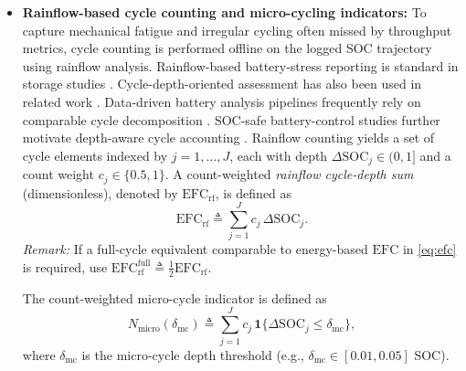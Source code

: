 \documentclass[preprint,12pt]{elsarticle}
\newcommand{\SOC}{\mathrm{SOC}}
\newcommand{\EFC}{\mathrm{EFC}}
\newcommand{\EFCrf}{\mathrm{EFC}_{\mathrm{rf}}}
\newcommand{\Nmicro}{N_{\mathrm{micro}}}
\newcommand{\dmc}{\delta_{\mathrm{mc}}}
\begin{document}
\begin{itemize}
\item \textbf{Rainflow-based cycle counting and micro-cycling indicators:}
To capture mechanical fatigue and irregular cycling often missed by throughput metrics, cycle counting is performed offline on the logged SOC trajectory using rainflow analysis. Rainflow-based battery-stress reporting is standard in storage studies \cite{gundogdu2018}. Cycle-depth-oriented assessment has also been used in related work \cite{soto2022}. Data-driven battery analysis pipelines frequently rely on comparable cycle decomposition \cite{attia2022}. SOC-safe battery-control studies further motivate depth-aware cycle accounting \cite{he2018convex}. Rainflow counting yields a set of cycle elements indexed by $j=1,\dots,J$, each with depth $\Delta \SOC_j\in(0,1]$ and a count weight $c_j\in\{0.5,1\}$. A count-weighted \emph{rainflow cycle-depth sum} (dimensionless), denoted by $\EFCrf$, is defined as
\begin{equation}
\EFCrf \triangleq \sum_{j=1}^{J} c_j\,\Delta \SOC_j .
\label{eq:efc_rf}
\end{equation}
\textit{Remark:} If a full-cycle equivalent comparable to energy-based $\EFC$ in \eqref{eq:efc} is required, use $\EFCrf^{\mathrm{full}} \triangleq \tfrac{1}{2}\EFCrf$.

The count-weighted micro-cycle indicator is defined as
\begin{equation}
\Nmicro(\dmc) \triangleq \sum_{j=1}^{J} c_j\,\mathbf{1}\{\Delta \SOC_j \le \dmc\},
\label{eq:nmicro}
\end{equation}
where $\dmc$ is the micro-cycle depth threshold (e.g., $\dmc\in[0.01,0.05]$ SOC).


\end{itemize}
\end{document}
